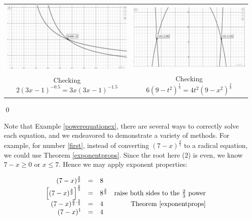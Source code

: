 \begin{ex}
\begin{enumerate}
\begin{center}

\begin{tabular}{cc}

\includegraphics[width=3in]{./PowerEqIneqGraphics/PowerEqEx05.jpg} & \includegraphics[width=3in]{./PowerEqIneqGraphics/PowerEqEx06.jpg} \\

Checking $2(3x-1)^{-0.5}  = 3x (3x-1)^{-1.5}$  & Checking  $6(9-t^2)^{\frac{1}{3}} = 4t^2 (9-x^2)^{\frac{2}{3}}$ \\

\end{tabular}

\end{center} 

\end{enumerate}

\qed

\end{ex}

Note that Example \ref{powerequationex}, there are several ways to correctly solve each equation, and we endeavored to demonstrate a variety of methods.  For example, for number \ref{first}, instead of converting $(7-x)^{\frac{3}{2}}$ to a radical equation, we could use Theorem \ref{exponentprops}.  Since the root here ($2$) is even, we know $7-x \geq 0$ or $x \leq 7$.  Hence we may apply exponent properties: 

\[ \begin{array}{rclr}  

(7-x)^{\frac{3}{2}} & = & 8 & \\

 \left[(7-x)^{\frac{3}{2}}\right]^{\frac{2}{3}} & = & 8^{\frac{2}{3}} & \text{raise both sides to the $\frac{2}{3}$ power} \\
 
 (7-x)^{\frac{3}{2} \cdot \frac{2}{3}} & = & 4 & \text{Theorem \ref{exponentprops}} \\
 
(7-x)^{1} & = & 4 \\ \end{array} \]

